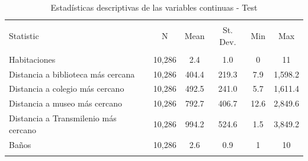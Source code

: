 
\begin{table}[!htbp] \centering 
  \caption{Estadísticas descriptivas de las variables continuas - Test} 
  \label{tab:resumen_continuas} 
\begin{tabular}{@{\extracolsep{5pt}}lccccc} 
\\[-1.8ex]\hline 
\hline \\[-1.8ex] 
Statistic & \multicolumn{1}{c}{N} & \multicolumn{1}{c}{Mean} & \multicolumn{1}{c}{St. Dev.} & \multicolumn{1}{c}{Min} & \multicolumn{1}{c}{Max} \\ 
\hline \\[-1.8ex] 
Habitaciones & 10,286 & 2.4 & 1.0 & 0 & 11 \\ 
Distancia a biblioteca más cercana & 10,286 & 404.4 & 219.3 & 7.9 & 1,598.2 \\ 
Distancia a colegio más cercano & 10,286 & 492.5 & 241.0 & 5.7 & 1,611.4 \\ 
Distancia a museo más cercano & 10,286 & 792.7 & 406.7 & 12.6 & 2,849.6 \\ 
Distancia a Transmilenio más cercano & 10,286 & 994.2 & 524.6 & 1.5 & 3,849.2 \\ 
Baños & 10,286 & 2.6 & 0.9 & 1 & 10 \\ 
\hline \\[-1.8ex] 
\end{tabular} 
\end{table} 
